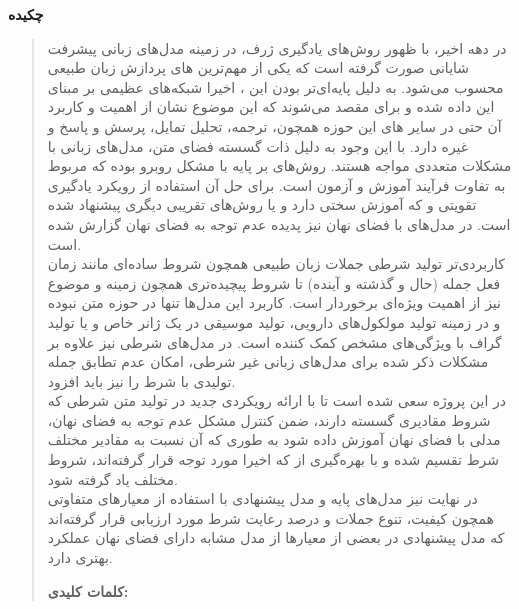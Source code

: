 \thispagestyle{empty}
\centerline{\textbf{\large{چکیده}}}
\begin{quote}
در دهه اخیر، با ظهور روش­‌های یادگیری ژرف، در زمینه مدل‌­های زبانی پیشرفت شایانی صورت گرفته است که یکی از مهم‌ترین \task{}‌های پردازش زبان طبیعی محسوب می‌شود. به دلیل پایه‌ای‌تر بودن این \task{}، اخیرا شبکه‌های عظیمی بر مبنای این \task{}  \pretrain{} داده شده و برای \task{} مقصد \finetuning{} می‌شوند که این موضوع نشان از اهمیت و کاربرد آن حتی در سایر \task{}‌های این حوزه همچون، ترجمه، تحلیل تمایل، پرسش و پاسخ و غیره دارد.
 با این وجود به دلیل ذات گسسته فضای متن، مدل‌های زبانی با مشکلات متعددی مواجه هستند. روش‌های بر پایه \teacherforcing{} با مشکل \expbias{} روبرو بوده که مربوط به تفاوت فرآیند آموزش و آزمون است. برای حل آن استفاده از رويکرد يادگيری تقويتی و \gan{} که آموزش سختی دارد و یا روش‌های تقریبی دیگری پيشنهاد شده است. در مدل‌های با فضای نهان نیز پدیده عدم توجه \decoder{} به فضای نهان گزارش شده است.
\\
\task{}
کاربردی‌­تر تولید شرطی جملات زبان طبیعی همچون شروط ساده­‌ای مانند زمان فعل جمله (حال و گذشته و آینده) تا شروط پیچیده‌­تری همچون زمینه و موضوع نیز از اهمیت ویژه‌ای برخوردار است. کاربرد این مدل‌ها تنها در حوزه متن نبوده و در زمینه تولید مولکول‌های دارویی، تولید موسیقی در یک ژانر خاص و یا تولید گراف با ویژگی‌های مشخص کمک کننده است. در مدل‌های شرطی نیز علاوه بر مشکلات ذکر شده برای مدل‌های زبانی غیر شرطی، امکان عدم تطابق جمله تولیدی با شرط را نیز باید افزود.
\\
در این پروژه سعی شده است تا با ارائه رویکردی جدید در تولید متن شرطی که شروط مقادیری گسسته دارند، ضمن کنترل مشکل عدم توجه به فضای نهان، مدلی \generative{} با فضای نهان آموزش داده شود به طوری که \priordist{} آن نسبت به مقادیر مختلف شرط تقسیم شده و با بهره‌گیری از \normalizingflownets{} که اخیرا مورد توجه قرار گرفته‌اند، \priordist{} شروط مختلف یاد گرفته شود.
\\
در نهایت نیز مدل‌های پایه و مدل پیشنهادی با استفاده از معیار‌های متفاوتی همچون کیفیت، تنوع جملات و درصد رعایت شرط مورد ارزیابی قرار گرفته‌اند که مدل پیشنهادی در بعضی از معیار‌ها از مدل مشابه دارای فضای نهان عملکرد بهتری دارد.

\vskip 1cm
\textbf{کلمات کلیدی:} 
\end{quote}